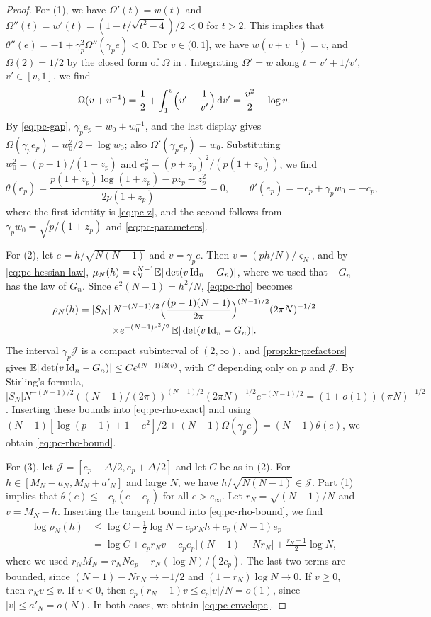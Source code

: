 \begin{proof}
For (1), we have $\Omega'(t)=w(t)$ and $\Omega''(t)=w'(t)=(1-t/\sqrt{t^2-4})/2<0$ for $t>2$. This implies that $\theta''(e)=-1+\gamma_p^2\Omega''(\gamma_pe)<0$. For $v\in(0,1]$, we have $w(v+v^{-1})=v$, and $\Omega(2)=1/2$ by the closed form of $\Omega$ in \cite[(2.4)]{SubagZeitouni2017}. Integrating $\Omega'=w$ along $t=v'+1/v'$, $v'\in[v,1]$, we find
\[
\Omega(v+v^{-1})=\frac12+\int_1^v\Bigl(v'-\frac1{v'}\Bigr)\,\mathrm d v'=\frac{v^2}2-\log v.
\]
By \eqref{eq:pc-gap}, $\gamma_pe_p=w_0+w_0^{-1}$, and the last display gives $\Omega(\gamma_pe_p)=w_0^2/2-\log w_0$; also $\Omega'(\gamma_pe_p)=w_0$. Substituting $w_0^2=(p-1)/(1+z_p)$ and $e_p^2=(p+z_p)^2/(p(1+z_p))$, we find
\[
\theta(e_p)=\frac{p(1+z_p)\log(1+z_p)-pz_p-z_p^2}{2p(1+z_p)}=0,\qquad \theta'(e_p)=-e_p+\gamma_pw_0=-c_p,
\]
where the first identity is \eqref{eq:pc-z}, and the second follows from $\gamma_pw_0=\sqrt{p/(1+z_p)}$ and \eqref{eq:pc-parameters}.

For (2), let $e=h/\sqrt{N(N-1)}$ and $v=\gamma_pe$. Then $v=(ph/N)/\varsigma_N$, and by \eqref{eq:pc-hessian-law}, $\mu_N(h)=\varsigma_N^{N-1}\mathbb E|\det(v\,\mathrm{Id}_n-G_n)|$, where we used that $-G_n$ has the law of $G_n$. Since $e^2(N-1)=h^2/N$, \eqref{eq:pc-rho} becomes
\begin{multline}\label{eq:pc-rho-exact}
\rho_N(h)=|S_N|\,N^{-(N-1)/2}\Bigl(\frac{(p-1)(N-1)}{2\pi}\Bigr)^{(N-1)/2}(2\pi N)^{-1/2}\\
\times e^{-(N-1)e^2/2}\,\mathbb E|\det(v\,\mathrm{Id}_n-G_n)|.
\end{multline}
The interval $\gamma_p\mathcal J$ is a compact subinterval of $(2,\infty)$, and \cref{prop:kr-prefactors} gives $\mathbb E|\det(v\,\mathrm{Id}_n-G_n)|\le Ce^{(N-1)\Omega(v)}$, with $C$ depending only on $p$ and $\mathcal J$. By Stirling's formula, $|S_N|N^{-(N-1)/2}((N-1)/(2\pi))^{(N-1)/2}(2\pi N)^{-1/2}e^{-(N-1)/2}=(1+o(1))(\pi N)^{-1/2}$. Inserting these bounds into \eqref{eq:pc-rho-exact} and using $(N-1)[\log(p-1)+1-e^2]/2+(N-1)\Omega(\gamma_pe)=(N-1)\theta(e)$, we obtain \eqref{eq:pc-rho-bound}.

For (3), let $\mathcal J=[e_p-\Delta/2,e_p+\Delta/2]$ and let $C$ be as in (2). For $h\in[M_N-a_N,M_N+a'_N]$ and large $N$, we have $h/\sqrt{N(N-1)}\in\mathcal J$. Part (1) implies that $\theta(e)\le-c_p(e-e_p)$ for all $e>e_\infty$. Let $r_N=\sqrt{(N-1)/N}$ and $v=M_N-h$. Inserting the tangent bound into \eqref{eq:pc-rho-bound}, we find
\begin{equation}\label{eq:pc-tangent}
\begin{split}
\log\rho_N(h)&\le\log C-\frac12\log N-c_pr_Nh+c_p(N-1)e_p\\
&=\log C+c_pr_Nv+c_pe_p\bigl[(N-1)-Nr_N\bigr]+\frac{r_N-1}2\log N,
\end{split}
\end{equation}
where we used $r_NM_N=r_NNe_p-r_N(\log N)/(2c_p)$. The last two terms are bounded, since $(N-1)-Nr_N\to-1/2$ and $(1-r_N)\log N\to0$. If $v\ge0$, then $r_Nv\le v$. If $v<0$, then $c_p(r_N-1)v\le c_p|v|/N=o(1)$, since $|v|\le a'_N=o(N)$. In both cases, we obtain \eqref{eq:pc-envelope}.
\end{proof}

